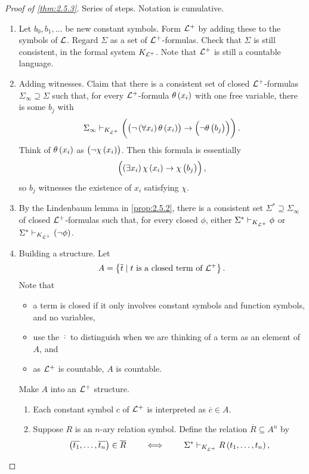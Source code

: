 \begin{proof}[Proof of \ref{thm:2.5.3}]
Series of steps. Notation is cumulative.
\begin{enumerate}[leftmargin=0.5in, label=Step \arabic*.]
\item Let $ b_0, b_1, \dots $ be new constant symbols. Form $ \mathcal{L}^+ $ by adding these to the symbols of $ \mathcal{L} $. Regard $ \Sigma $ as a set of $ \mathcal{L}^+ $-formulas. Check that $ \Sigma $ is still consistent, in the formal system $ K_{\mathcal{L}^+} $. Note that $ \mathcal{L}^+ $ is still a countable language.
\item Adding witnesses. Claim that there is a consistent set of closed $ \mathcal{L}^+ $-formulas $ \Sigma_\infty \supseteq \Sigma $ such that, for every $ \mathcal{L}^+ $-formula $ \theta\br{x_i} $ with one free variable, there is some $ b_j $ with
$$ \Sigma_\infty \vdash_{K_{\LL^+}} \impb{\notb{\fab{x_i}\theta\br{x_i}}}{\notb{\theta\br{b_j}}}. $$
Think of $ \theta\br{x_i} $ as $ \notb{\chi\br{x_i}} $. Then this formula is essentially
$$ \impb{\teb{x_i}\chi\br{x_i}}{\chi\br{b_j}}, $$
so $ b_j $ witnesses the existence of $ x_i $ satisfying $ \chi $.
\item By the Lindenbaum lemma in \ref{prop:2.5.2}, there is a consistent set $ \Sigma^* \supseteq \Sigma_\infty $ of closed $ \mathcal{L}^+ $-formulas such that, for every closed $ \phi $, either $ \Sigma^* \vdash_{K_{\mathcal{L}^+}} \phi $ or $ \Sigma^* \vdash_{K_{\LL^+}} \notb{\phi} $.
\item Building a structure. Let
$$ A = \cbr{\overline{t} \mid t \ \text{is a closed term of} \ \LL^+}. $$
Note that
\begin{itemize}
\item a term is closed if it only involves constant symbols and function symbols, and no variables,
\item use the $ \overline{\cdot} $ to distinguish when we are thinking of a term as an element of $ A $, and
\item as $ \mathcal{L}^+ $ is countable, $ A $ is countable.
\end{itemize}
Make $ A $ into an $ \mathcal{L}^+ $ structure.
\begin{enumerate}
\item Each constant symbol $ c $ of $ \mathcal{L}^+ $ is interpreted as $ \overline{c} \in A $.
\item Suppose $ R $ is an $ n $-ary relation symbol. Define the relation $ \overline{R} \subseteq A^n $ by
$$ \br{\overline{t_1}, \dots, \overline{t_n}} \in \overline{R} \qquad \iff \qquad \Sigma^* \vdash_{K_{\LL^+}} R\br{t_1, \dots, t_n}, $$

\end{enumerate}
\end{enumerate}
\end{proof}
